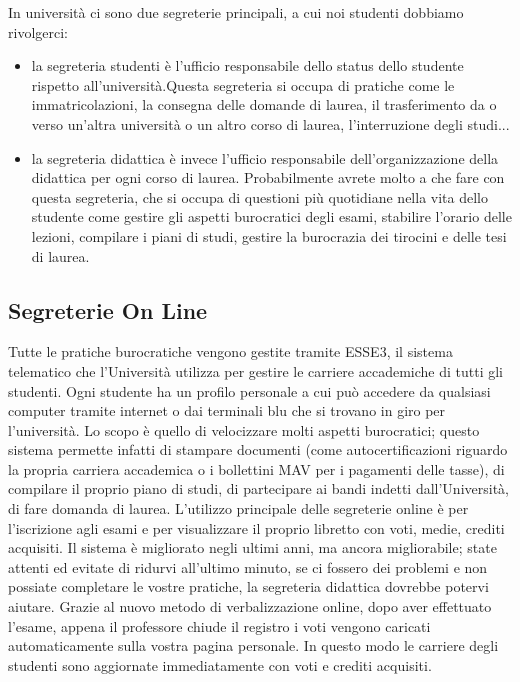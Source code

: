 In università ci sono due segreterie principali, a cui noi studenti dobbiamo rivolgerci:
\begin{itemize}
\item la segreteria studenti è l'ufficio responsabile dello status dello studente rispetto all'università.Questa segreteria si occupa di pratiche come le immatricolazioni, la consegna delle domande di laurea, il trasferimento da o verso un'altra università o un altro corso di laurea, l'interruzione degli studi...
\item la segreteria didattica è invece l'ufficio responsabile dell'organizzazione della didattica per ogni corso di laurea. Probabilmente avrete molto a che fare con questa segreteria, che si occupa di questioni più quotidiane nella vita dello studente come gestire gli aspetti burocratici degli esami, stabilire l'orario delle lezioni, compilare i piani di studi, gestire la burocrazia dei tirocini e delle tesi di laurea.
\end{itemize}

\subsection{Segreterie On Line}
Tutte le pratiche burocratiche vengono gestite tramite ESSE3, il sistema telematico che l'Università utilizza per gestire le carriere accademiche di tutti gli studenti. 
Ogni studente ha un profilo personale a cui può accedere da qualsiasi computer tramite internet o dai terminali blu che si trovano in giro per l'università. Lo scopo è quello di velocizzare molti aspetti burocratici; questo sistema permette infatti di stampare documenti (come autocertificazioni riguardo la propria carriera accademica o i bollettini MAV per i pagamenti delle tasse), di compilare il proprio piano di studi, di partecipare ai bandi indetti dall'Università, di fare domanda di laurea. L'utilizzo principale delle segreterie online è per l'iscrizione agli esami e per visualizzare il proprio libretto con voti, medie, crediti acquisiti. 
Il sistema è migliorato negli ultimi anni, ma ancora migliorabile; state attenti ed evitate di ridurvi all'ultimo minuto, se ci fossero dei problemi e non possiate completare le vostre pratiche, la segreteria didattica dovrebbe potervi aiutare.
Grazie al nuovo metodo di verbalizzazione online, dopo aver effettuato l'esame, appena il professore chiude il registro i voti vengono caricati automaticamente sulla vostra pagina personale. In questo modo le carriere degli studenti sono aggiornate immediatamente con voti e crediti acquisiti.


